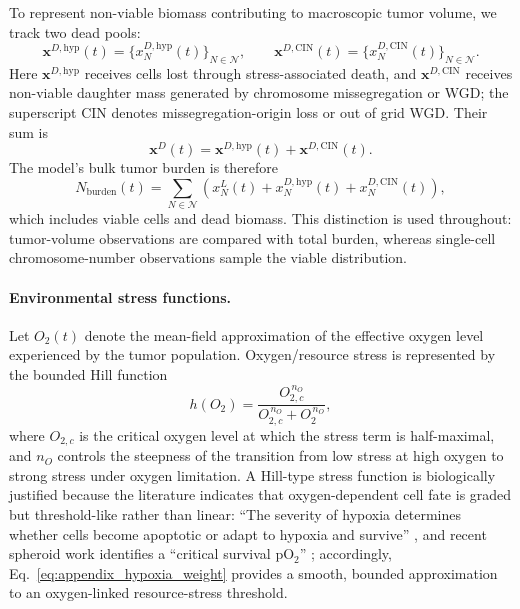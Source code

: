 \documentclass[11pt]{article}
\begin{document}
To represent non-viable biomass contributing to macroscopic tumor volume, we track two dead pools:
\begin{equation}
\mathbf{x}^{D,\mathrm{hyp}}(t)=\{x_{N}^{D,\mathrm{hyp}}(t)\}_{N\in\mathcal N},
\qquad
\mathbf{x}^{D,\mathrm{CIN}}(t)=\{x_{N}^{D,\mathrm{CIN}}(t)\}_{N\in\mathcal N}.
\label{eq:appendix_dead_pools}
\end{equation}
Here $\mathbf{x}^{D,\mathrm{hyp}}$ receives cells lost through stress-associated death, and $\mathbf{x}^{D,\mathrm{CIN}}$ receives non-viable daughter mass generated by chromosome missegregation or WGD; the superscript $\mathrm{CIN}$ denotes missegregation-origin loss or out of grid WGD. Their sum is
\begin{equation}
\mathbf{x}^{D}(t)=\mathbf{x}^{D,\mathrm{hyp}}(t)+\mathbf{x}^{D,\mathrm{CIN}}(t).
\label{eq:appendix_total_dead_pool}
\end{equation}
The model's bulk tumor burden is therefore
\begin{equation}
N_{\mathrm{burden}}(t)
=
\sum_{N\in\mathcal N}
\left(x_{N}^L(t)+x_{N}^{D,\mathrm{hyp}}(t)+x_{N}^{D,\mathrm{CIN}}(t)\right),
\label{eq:appendix_tumor_burden}
\end{equation}
which includes viable cells and dead biomass. This distinction is used throughout: tumor-volume observations are compared with total burden, whereas single-cell chromosome-number observations sample the viable distribution.

\paragraph{Environmental stress functions.}

Let $O_2(t)$ denote the mean-field approximation of the effective oxygen level experienced by the tumor population. Oxygen/resource stress is represented by the bounded Hill function
\begin{equation} 
h(O_2)=\frac{O_{2,c}^{\,n_O}}{O_{2,c}^{\,n_O}+O_2^{\,n_O}},
\label{eq:appendix_hypoxia_weight}
\end{equation}
where $O_{2,c}$ is the critical oxygen level at which the stress term is half-maximal, and $n_O$ controls the steepness of the transition from low stress at high oxygen to strong stress under oxygen limitation. A Hill-type stress function is biologically justified because the literature indicates that oxygen-dependent cell fate is graded but threshold-like rather than linear: ``The severity of hypoxia determines whether cells become apoptotic or adapt to hypoxia and survive'' \cite{greijer_role_2004}, and recent spheroid work identifies a ``critical survival pO$_2$'' \cite{shang_novel_2024}; accordingly, Eq.~\eqref{eq:appendix_hypoxia_weight} provides a smooth, bounded approximation to an oxygen-linked resource-stress threshold.
\end{document}
